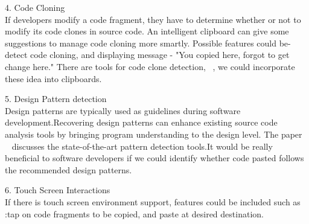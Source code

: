 \documentclass{acm_proc_article-sp}
\begin{document}
4. Code Cloning\\
 If developers modify a code fragment, they have to determine
whether or not to modify its code clones in source code. An intelligent clipboard can  give some suggestions to manage code cloning more smartly. Possible features could be-detect code cloning, and displaying message - "You copied here, forgot to get change here." There are tools for code clone detection,  ~\cite{CloneTag}, we could incorporate these idea into clipboards.

5. Design Pattern detection\\ 
Design patterns are typically used as guidelines during
software development.Recovering design patterns can enhance existing source code analysis tools by bringing program understanding to
the design level. The paper ~\cite{Pattern} discusses the state-of-the-art pattern detection tools.It would be really beneficial to software developers if we could identify whether code pasted follows the recommended  design patterns.

6. Touch Screen Interactions\\
If there is touch screen environment support, features could be included such as :tap on code fragments to be copied, and paste at desired destination. \\
\end{document}
